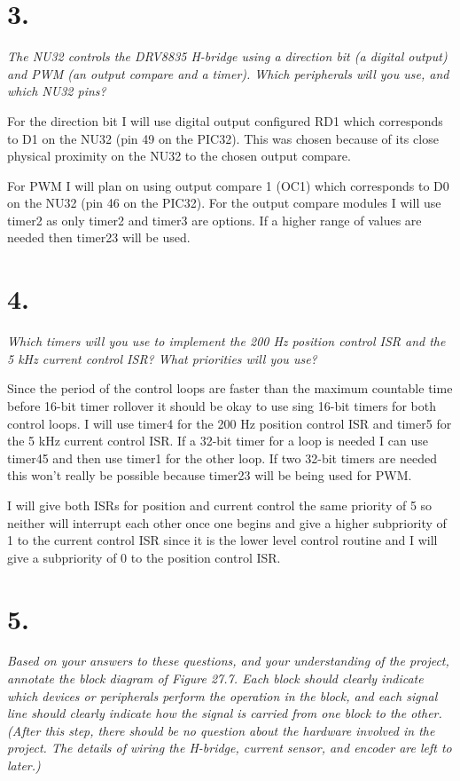 \documentclass[12pt]{article}
\begin{document}
\section*{3.}
\textit{The NU32 controls the DRV8835 H-bridge using a direction bit (a digital output) and PWM (an output compare and a timer). Which peripherals will you use, and which NU32 pins?}

For the direction bit I will use digital output configured RD1 which corresponds to D1 on the NU32 (pin 49 on the PIC32). 
This was chosen because of its close physical proximity on the NU32 to the chosen output compare.

For PWM I will plan on using output compare 1 (OC1) which corresponds to D0 on the NU32 (pin 46 on the PIC32).
For the output compare modules I will use timer2 as only timer2 and timer3 are options.
If a higher range of values are needed then timer23 will be used.

\section*{4.}
\textit{Which timers will you use to implement the 200 Hz position control ISR and the 5 kHz current control ISR? What priorities will you use?}

Since the period of the control loops are faster than the maximum countable time before 16-bit timer rollover it should be okay to use sing 16-bit timers for both control loops.
I will use timer4 for the 200 Hz position control ISR and timer5 for the 5 kHz current control ISR. 
If a 32-bit timer for a loop is needed I can use timer45 and then use timer1 for the other loop.
If two 32-bit timers are needed this won't really be possible because timer23 will be being used for PWM.

I will give both ISRs for position and current control the same priority of 5 so neither will interrupt each other once one begins and give a higher subpriority of 1 to the current control ISR since it is the lower level control routine and I will give a subpriority of 0 to the position control ISR. 

\section*{5.}
\textit{Based on your answers to these questions, and your understanding of the project, annotate the block diagram of Figure 27.7. Each block should clearly indicate which devices or peripherals perform the operation in the block, and each signal line should clearly indicate how the signal is carried from one block to the other. (After this step, there should be no question about the hardware involved in the project. The details of wiring the H-bridge, current sensor, and encoder are left to later.)}
\end{document}
